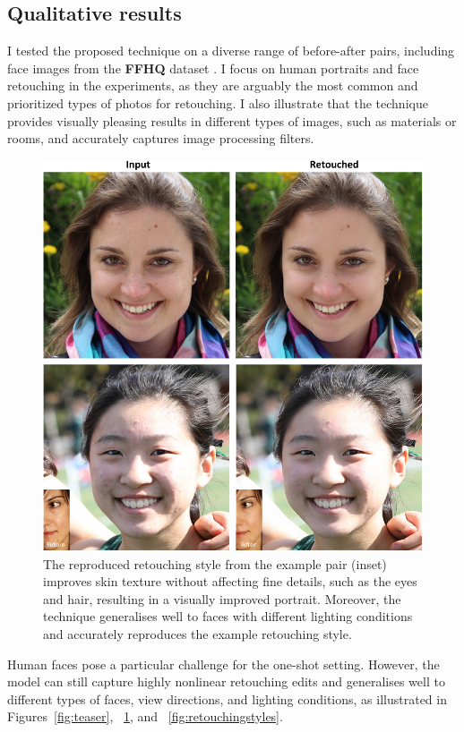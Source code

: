 \subsection{Qualitative results}
 I tested the proposed technique on a diverse range of before-after pairs, including face images from the \textbf{FFHQ} dataset \cite{karras2019style}. I focus on human portraits and face retouching in the experiments, as they are arguably the most common and prioritized types of photos for retouching. I also illustrate that the technique provides visually pleasing results in different types of images, such as materials or rooms, and accurately captures image processing filters.
 
\begin{figure}[th] %
    \centering
	\includegraphics[width=0.8\columnwidth]{Chapters/detail-retouching-figs/res_diff_light_2_cvmp.pdf}
    \caption{\label{fig:newdataset_ex}The reproduced retouching style from the example pair (inset) improves skin texture without affecting fine details, such as the eyes and hair, resulting in a visually improved portrait. Moreover, the technique generalises well to faces with different lighting conditions and accurately reproduces the example retouching style.}
 
\end{figure}
Human faces pose a particular challenge for the one-shot setting. However, the model can still capture highly nonlinear retouching edits and generalises well to different types of faces, view directions, and lighting conditions, as illustrated in Figures~\ref{fig:teaser}, ~\ref{fig:newdataset_ex}, and ~\ref{fig:retouchingstyles}.

